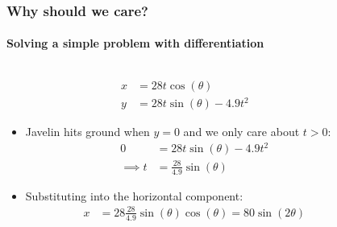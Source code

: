 \documentclass[]{article}
\begin{document}
\begin{frame}
\frametitle{Why should we care?}
\framesubtitle{Solving a simple problem with differentiation}

\begin{columns}
\begin{column}{0.65\textwidth}
	\vspace{-1ex}
	\begin{align*}
		x &= 28 t \cos(\theta)\\
		y &= 28 t \sin(\theta) - 4.9 t^2
	\end{align*}\vspace{-3ex}
	\begin{itemize}
		\item Javelin hits ground when $y = 0$ and we only care about $t>0$:
		\begin{align*}
		0 &= 28 t \sin(\theta) - 4.9 t^2 \\
		\implies t &= \frac{28}{4.9} \sin(\theta)
		\end{align*}
		\item Substituting into the horizontal component: \begin{align*}
		x &= 28 \frac{28}{4.9} \sin(\theta) \cos(\theta) = 80 \sin(2\theta)
		\end{align*}
	\end{itemize}
\end{column}
\begin{column}{0.35\textwidth}
\end{column}
\end{columns}
\end{frame}
\end{document}
